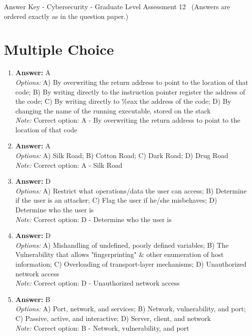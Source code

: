 \documentclass[12pt]{article}
\begin{document}
\begin{center}
Answer Key - Cybersecurity - Graduate Level Assessment 12 \
\small (Answers are ordered exactly as in the question paper.)
\end{center}

\section*{Multiple Choice}
\begin{enumerate}[label=\arabic*.]
\item \textbf{Answer:} A
\\ \textit{Options:} A) By overwriting the return address to point to the location of that code; B) By writing directly to the instruction pointer register the address of the code; C) By writing directly to \%eax the address of the code; D) By changing the name of the running executable, stored on the stack
\\ \textit{Note:} Correct option: A - By overwriting the return address to point to the location of that code
\item \textbf{Answer:} A
\\ \textit{Options:} A) Silk Road; B) Cotton Road; C) Dark Road; D) Drug Road
\\ \textit{Note:} Correct option: A - Silk Road
\item \textbf{Answer:} D
\\ \textit{Options:} A) Restrict what operations/data the user can access; B) Determine if the user is an attacker; C) Flag the user if he/she misbehaves; D) Determine who the user is
\\ \textit{Note:} Correct option: D - Determine who the user is
\item \textbf{Answer:} D
\\ \textit{Options:} A) Mishandling of undefined, poorly defined variables; B) The Vulnerability that allows "fingerprinting" \& other enumeration of host information; C) Overloading of transport-layer mechanisms; D) Unauthorized network access
\\ \textit{Note:} Correct option: D - Unauthorized network access
\item \textbf{Answer:} B
\\ \textit{Options:} A) Port, network, and services; B) Network, vulnerability, and port; C) Passive, active, and interactive; D) Server, client, and network
\\ \textit{Note:} Correct option: B - Network, vulnerability, and port
\end{enumerate}
\end{document}
